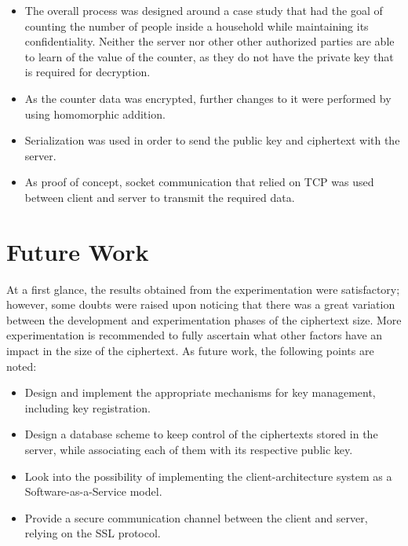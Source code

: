 \begin{itemize}
\item The overall process was designed around a case study that had the goal of counting the number of people inside a household while maintaining its confidentiality. Neither the server nor other other authorized parties are able to learn of the value of the counter, as they do not have the private key that is required for decryption.
\item As the counter data was encrypted, further changes to it were performed by using homomorphic addition. 
\item Serialization was used in order to send the public key and ciphertext with the server.
\item As proof of concept, socket communication that relied on TCP was used between client and server to transmit the required data.
\end{itemize} 

\section{Future Work}
At a first glance, the results obtained from the experimentation were satisfactory; however, some doubts were raised upon noticing that there was a great variation between the development and experimentation phases of the ciphertext size. More experimentation is recommended to fully ascertain what other factors have an impact in the size of the ciphertext. As future work, the following points are noted:

\begin{itemize}
\item Design and implement the appropriate mechanisms for key management, including key registration.
\item Design a database scheme to keep control of the ciphertexts stored in the server, while associating each of them with its respective public key.
\item Look into the possibility of implementing the client-architecture system as a Software-as-a-Service model.
\item Provide a secure communication channel between the client and server, relying on the SSL protocol.
\end{itemize}

\clearpage
